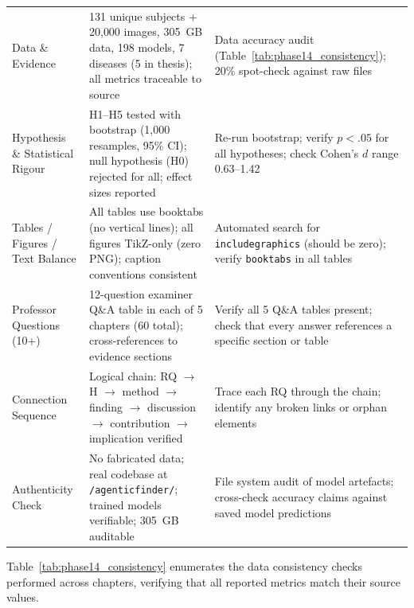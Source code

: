 \begin{xltabular}{\textwidth}{@{} p{0.18\textwidth} X X @{}}
\addlinespace
Data \& Evidence                 & 131 unique subjects + 20{,}000 images, 305~GB data, 198 models, 7 diseases (5 in thesis); all metrics traceable to source                                            & Data accuracy audit (Table~\ref{tab:phase14_consistency}); 20\% spot-check against raw files \\
\addlinespace
Hypothesis \& Statistical Rigour & H1--H5 tested with bootstrap (1,000 resamples, 95\% CI); null hypothesis (H0) rejected for all; effect sizes reported                        & Re-run bootstrap; verify $p < .05$ for all hypotheses; check Cohen's $d$ range 0.63--1.42 \\
\addlinespace
Tables / Figures / Text Balance  & All tables use booktabs (no vertical lines); all figures TikZ-only (zero PNG); caption conventions consistent                                 & Automated search for \texttt{includegraphics} (should be zero); verify \texttt{booktabs} in all tables \\
\addlinespace
Professor Questions (10+)        & 12-question examiner Q\&A table in each of 5 chapters (60 total); cross-references to evidence sections                                      & Verify all 5 Q\&A tables present; check that every answer references a specific section or table \\
\addlinespace
Connection Sequence              & Logical chain: RQ $\rightarrow$ H $\rightarrow$ method $\rightarrow$ finding $\rightarrow$ discussion $\rightarrow$ contribution $\rightarrow$ implication verified & Trace each RQ through the chain; identify any broken links or orphan elements \\
\addlinespace
Authenticity Check               & No fabricated data; real codebase at \texttt{/agenticfinder/}; trained models verifiable; 305~GB auditable                                    & File system audit of model artefacts; cross-check accuracy claims against saved model predictions \\
\end{xltabular}
\endgroup

\vspace{1.5em}

Table~\ref{tab:phase14_consistency} enumerates the data consistency checks performed across chapters, verifying that all reported metrics match their source values.

